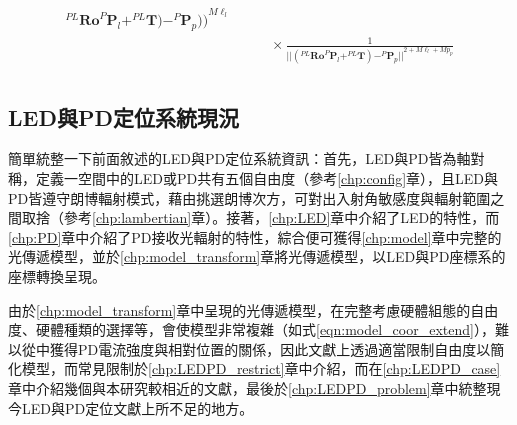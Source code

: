 \begin{description}
\begin{equation}
\begin{aligned}
{                                        ^{PL}\boldsymbol{Ro}^{P}\boldsymbol{P}_l
                                        +^{PL}\boldsymbol{T}
                                    )
                                    - ^{P}\boldsymbol{P}_p
                                )
                            )
                        }^{M\ell_{l}}   \\
                & \qquad \times
                   \frac{     
                        1   
                    } 
                    {
                        {
                            ||
                                (^{PL}\boldsymbol{Ro}^{P}\boldsymbol{P}_l+^{PL}\boldsymbol{T})
                                - ^{P}\boldsymbol{P}_p
                            ||
                        }^{2+M\ell_l+Mp_p}
                    }\\
            \end{aligned}
        \end{equation}

        \end{description}   


        






    \subsection{LED與PD定位系統現況}
    \label{chp:LEDPD_now}
        
        簡單統整一下前面敘述的LED與PD定位系統資訊：首先，LED與PD皆為軸對稱，定義一空間中的LED或PD共有五個自由度（參考\ref{chp:config}章），且LED與PD皆遵守朗博輻射模式，藉由挑選朗博次方，可對出入射角敏感度與輻射範圍之間取捨（參考\ref{chp:lambertian}章）。接著，\ref{chp:LED}章中介紹了LED的特性，而\ref{chp:PD}章中介紹了PD接收光輻射的特性，綜合便可獲得\ref{chp:model}章中完整的光傳遞模型，並於\ref{chp:model_transform}章將光傳遞模型，以LED與PD座標系的座標轉換呈現。

        由於\ref{chp:model_transform}章中呈現的光傳遞模型，在完整考慮硬體組態的自由度、硬體種類的選擇等，會使模型非常複雜（如式\ref{eqn:model_coor_extend}），難以從中獲得PD電流強度與相對位置的關係，因此文獻上透過適當限制自由度以簡化模型，而常見限制於\ref{chp:LEDPD_restrict}章中介紹，而在\ref{chp:LEDPD_case}章中介紹幾個與本研究較相近的文獻，最後於\ref{chp:LEDPD_problem}章中統整現今LED與PD定位文獻上所不足的地方。



        


